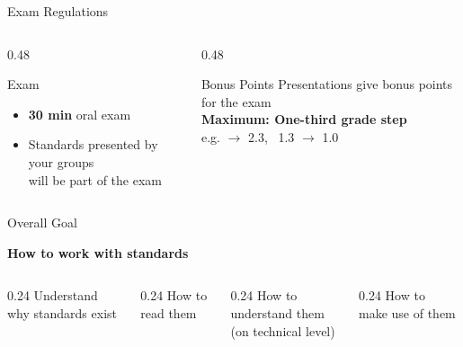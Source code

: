 \begin{frame}{Exam Regulations}

\begin{columns}[T,onlytextwidth]
    \begin{column}{0.48\textwidth}
        \begin{block}{Exam}
            \begin{itemize}
                \item \textbf{30 min} oral exam
                \item Standards presented by your groups\\ will be part of the exam
            \end{itemize}
        \end{block}
    \end{column}

    \begin{column}{0.48\textwidth}
        \begin{alertblock}{Bonus Points}
            \centering
            Presentations give bonus points for the exam\\[0.2em]
            \textbf{Maximum: One-third grade step}\\
            \small e.g. $\rightarrow$ 2.3, \, 1.3 $\rightarrow$ 1.0
        \end{alertblock}
    \end{column}
\end{columns}

\vspace{0.5cm}

\begin{block}{Overall Goal}
    \begin{center}
        \large
        \textbf{How to work with standards}
    \end{center}
    \vspace{-0.1cm}
    \begin{columns}[T,onlytextwidth]
        \begin{column}{0.24\textwidth}
            \centering
            Understand\\
            why standards exist
        \end{column}
        \begin{column}{0.24\textwidth}
            \centering
            How to\\
            read them
        \end{column}
        \begin{column}{0.24\textwidth}
            \centering
            How to\\
            understand them\\
            (on technical level)
        \end{column}
        \begin{column}{0.24\textwidth}
            \centering
            How to\\
            make use of them
        \end{column}
    \end{columns}
\end{block}

\end{frame}


